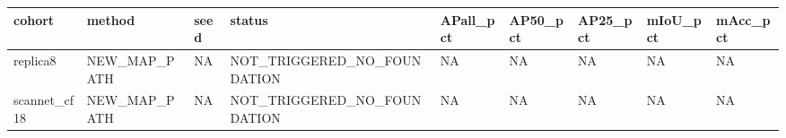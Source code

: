 \begin{tabular}{lllllllll}
\toprule
cohort & method & seed & status & APall\_pct & AP50\_pct & AP25\_pct & mIoU\_pct & mAcc\_pct \\
\midrule
replica8 & NEW\_MAP\_PATH & NA & NOT\_TRIGGERED\_NO\_FOUNDATION & NA & NA & NA & NA & NA \\
scannet\_cf18 & NEW\_MAP\_PATH & NA & NOT\_TRIGGERED\_NO\_FOUNDATION & NA & NA & NA & NA & NA \\
\bottomrule
\end{tabular}
